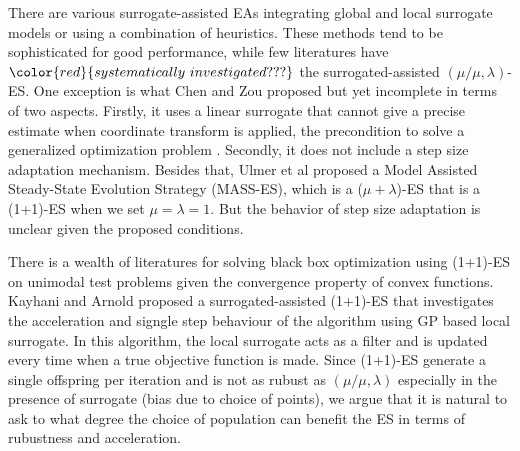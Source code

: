 

There are various surrogate-assisted EAs integrating global and local surrogate models or using a combination of heuristics. These methods tend to be sophisticated for good performance, while few literatures have $\color{red}{systematically\ investigated ???}$ the surrogated-assisted $(\mu/\mu,\lambda)$-ES. One exception is what Chen and Zou \cite{10.1007/978-3-319-09333-8_4} proposed but yet incomplete in terms of two aspects. Firstly, it uses a linear surrogate that cannot give a precise estimate when coordinate transform is applied, the precondition to solve a generalized optimization problem \cite{DBLP:conf/ppsn/KayhaniA18}. Secondly, it does not include a step size adaptation mechanism. Besides that, Ulmer et al \cite{Ulmer2005} proposed a Model Assisted Steady-State Evolution Strategy (MASS-ES), which is a ($\mu+\lambda$)-ES that is a (1+1)-ES when we set $\mu=\lambda=1$. But the behavior of step size adaptation is unclear given the proposed conditions.






There is a wealth of literatures for solving black box optimization using (1+1)-ES on unimodal test problems given the convergence property of convex functions. Kayhani and Arnold \cite{DBLP:conf/ppsn/KayhaniA18} proposed a surrogated-assisted (1+1)-ES that investigates the acceleration and signgle step behaviour of the algorithm using GP based local surrogate. In this algorithm, the local surrogate acts as a filter and is updated every time when a true objective function is made. Since (1+1)-ES generate a single offspring per iteration and is not as rubust as $(\mu/\mu,\lambda)$ especially in the presence of surrogate (bias due to choice of points), we argue that it is natural to ask to what degree the choice of population can benefit the ES in terms of rubustness and acceleration.


